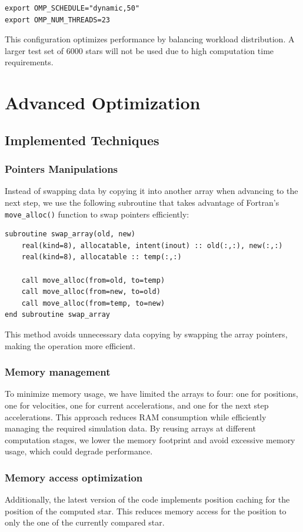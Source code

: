\documentclass[english,11pt]{article}
\begin{document}
\begin{verbatim}
export OMP_SCHEDULE="dynamic,50"
export OMP_NUM_THREADS=23
\end{verbatim}

This configuration optimizes performance by balancing workload distribution. A larger test set of 6000 stars will not be used due to high computation time requirements.


\section{Advanced Optimization}
\subsection{Implemented Techniques}
\subsubsection{Pointers Manipulations}
Instead of swapping data by copying it into another array when advancing to the next step, we use the following subroutine that takes advantage of Fortran's \texttt{move\_alloc()} function to swap pointers efficiently:

\begin{verbatim}
subroutine swap_array(old, new)
    real(kind=8), allocatable, intent(inout) :: old(:,:), new(:,:)
    real(kind=8), allocatable :: temp(:,:)

    call move_alloc(from=old, to=temp)
    call move_alloc(from=new, to=old)
    call move_alloc(from=temp, to=new)
end subroutine swap_array
\end{verbatim}

This method avoids unnecessary data copying by swapping the array pointers, making the operation more efficient.

\subsubsection{Memory management}
To minimize memory usage, we have limited the arrays to four: one for positions, one for velocities, one for current accelerations, and one for the next step accelerations. This approach reduces RAM consumption while efficiently managing the required simulation data. By reusing arrays at different computation stages, we lower the memory footprint and avoid excessive memory usage, which could degrade performance.

\subsubsection{Memory access optimization}
Additionally, the latest version of the code implements position caching for the position of the computed star. This reduces memory access for the position to only the one of the currently compared star.
\end{document}
